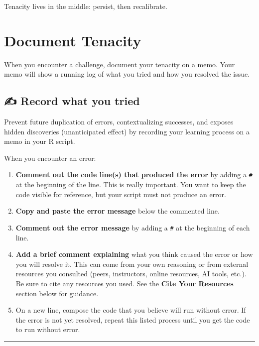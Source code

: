 \documentclass[
  12pt,
]{scrreprt}
\begin{document}
Tenacity lives in the middle: persist, then recalibrate.

\section{Document Tenacity}\label{document-tenacity}

When you encounter a challenge, document your tenacity on a memo. Your
memo will show a running log of what you tried and how you resolved the
issue.

\subsection{✍️ Record what you tried}\label{record-what-you-tried}

Prevent future duplication of errors, contextualizing successes, and
exposes hidden discoveries (unanticipated effect) by recording your
learning process on a memo in your R script.

When you encounter an error:

\begin{enumerate}
\def\labelenumi{\arabic{enumi}.}
\item
  \textbf{Comment out the code line(s) that produced the error} by
  adding a \texttt{\#} at the beginning of the line. This is really
  important. You want to keep the code visible for reference, but your
  script must not produce an error.
\item
  \textbf{Copy and paste the error message} below the commented line.
\item
  \textbf{Comment out the error message} by adding a \texttt{\#} at the
  beginning of each line.
\item
  \textbf{Add a brief comment explaining} what you think caused the
  error or how you will resolve it. This can come from your own
  reasoning or from external resources you consulted (peers,
  instructors, online resources, AI tools, etc.). Be sure to cite any
  resources you used. See the \textbf{Cite Your Resources} section below
  for guidance.
\item
  On a new line, compose the code that you believe will run without
  error. If the error is not yet resolved, repeat this listed process
  until you get the code to run without error.
\end{enumerate}

\begin{center}\rule{0.5\linewidth}{0.5pt}\end{center}
\end{document}
